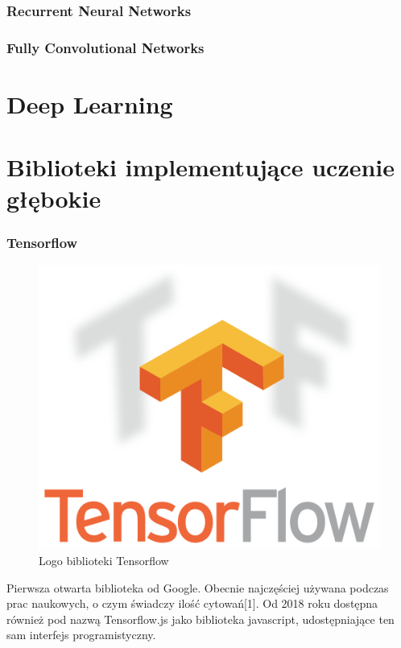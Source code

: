 \documentclass[12pt,a4paper,twoside,titlepage,openright]{book}
\begin{document}
\subsection{Recurrent Neural Networks}
\subsection{Fully Convolutional Networks}

\chapter{Deep Learning}
\chapter{Biblioteki implementujące uczenie głębokie}

\subsection{Tensorflow}
\begin{figure}[h]
	\centering
			\includegraphics[resolution=120]{Tensorflow.png}
		\caption{Logo biblioteki Tensorflow}
\end{figure}
Pierwsza otwarta biblioteka od Google. Obecnie najczęściej używana podczas prac naukowych, o czym świadczy ilość cytowań[1]. Od 2018 roku dostępna również pod nazwą Tensorflow.js jako biblioteka javascript, udostępniające ten sam interfejs programistyczny.
\end{document}
